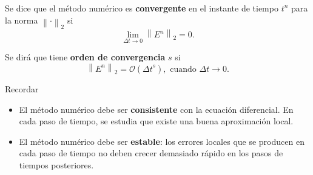 \begin{frame}
    \frametitle{\secname}

    \begin{definition}
        Se dice que el método numérico es \textbf{convergente} en el
        instante de tiempo $t^{n}$ para la norma
        ${\left\|\cdot\right\|}_{2}$ si
        \begin{equation*}
            \lim_{\Delta t\to0}
            {\left\|E^{n}\right\|}_{2}=
            0.
        \end{equation*}

        Se dirá que tiene \textbf{orden de convergencia} $s$ si
        \begin{equation*}
            \left\|
            E^{n}
            \right\|_{2}=
            \mathcal{O}
            \left({\Delta t}^{s}\right),
            \text{ cuando }
            \Delta t\to 0.
        \end{equation*}
    \end{definition}

    \begin{exampleblock}{Recordar}
        \begin{itemize}
            \item

                  El método numérico debe ser \textbf{consistente} con la
                  ecuación diferencial.
                  En cada paso de tiempo, se estudia que existe una buena
                  aproximación local.

            \item

                  El método numérico debe ser \textbf{estable}: los errores
                  locales que se producen en cada paso de tiempo no deben
                  crecer demasiado rápido en los pasos de tiempos posteriores.
        \end{itemize}
    \end{exampleblock}
\end{frame}

